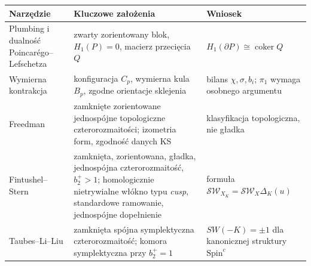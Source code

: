 \begin{center}
\begingroup
\footnotesize
\renewcommand{\arraystretch}{1.12}
\begin{tabular}{@{}p{.22\linewidth}p{.40\linewidth}p{.30\linewidth}@{}}
\hline
\textbf{Narzędzie} & \textbf{Kluczowe założenia} & \textbf{Wniosek}\\
\hline
{\raggedright Plumbing i dualność Poincar\'ego--Lefschetza\par}
 & {\raggedright zwarty zorientowany blok, $H_1(P)=0$, macierz przecięcia $Q$\par}
 & {\raggedright $H_1(\partial P)\cong\operatorname{coker}Q$\par}\\
{\raggedright Wymierna kontrakcja\par}
 & {\raggedright konfiguracja $C_p$, wymierna kula $B_p$, zgodne orientacje sklejenia\par}
 & {\raggedright bilans $\chi,\sigma,b_i$; $\pi_1$ wymaga osobnego argumentu\par}\\
{\raggedright Freedman\par}
 & {\raggedright zamknięte zorientowane jednospójne topologiczne czterorozmaitości; izometria form, zgodność danych KS\par}
 & {\raggedright klasyfikacja topologiczna, nie gładka\par}\\
{\raggedright Fintushel--Stern\par}
 & {\raggedright zamknięta, zorientowana, gładka, jednospójna czterorozmaitość, $b_2^+>1$; homologicznie nietrywialne włókno typu \emph{cusp}, standardowe ramowanie, jednospójne dopełnienie\par}
 & {\raggedright formuła $\mathcal{SW}_{X_K}=\mathcal{SW}_X\Delta_K(u)$\par}\\
{\raggedright Taubes--Li--Liu\par}
 & {\raggedright zamknięta spójna symplektyczna czterorozmaitość; komora symplektyczna przy $b_2^+=1$\par}
 & {\raggedright $SW(-K)=\pm1$ dla kanonicznej struktury $\mathrm{Spin}^c$\par}\\
\hline
\end{tabular}
\endgroup
\end{center}


